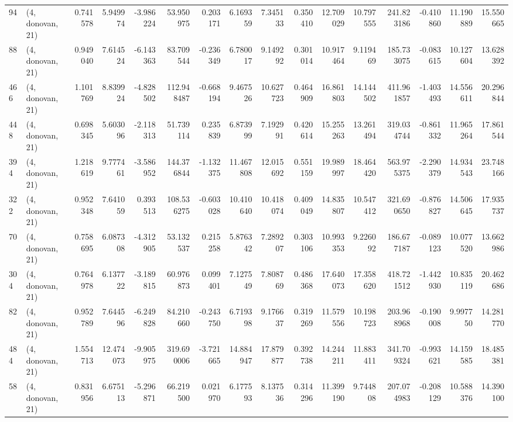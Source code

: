 \begin{tabular}{llrrrrrrrrrrrrrr}
94  &  (4, donovan, 21) &   0.741578 &   5.949974 &  -3.986224 &    53.950975 &   0.203171 &   6.169359 &   7.345133 &  0.350410 &  12.709029 &  10.797555 &    241.823186 &   -0.410860 &   11.190889 &   15.550665 \\
88  &  (4, donovan, 21) &   0.949040 &   7.614524 &  -6.143363 &    83.709544 &  -0.236349 &   6.780017 &   9.149292 &  0.301014 &  10.917464 &   9.119469 &    185.733075 &   -0.083615 &   10.127604 &   13.628392 \\
466 &  (4, donovan, 21) &   1.101769 &   8.839924 &  -4.828502 &   112.948487 &  -0.668194 &   9.467526 &  10.627723 &  0.464909 &  16.861803 &  14.144502 &    411.961857 &   -1.403493 &   14.556611 &   20.296844 \\
448 &  (4, donovan, 21) &   0.698345 &   5.603096 &  -2.118313 &    51.739114 &   0.235839 &   6.873999 &   7.192991 &  0.420614 &  15.255263 &  13.261494 &    319.034744 &   -0.861332 &   11.965264 &   17.861544 \\
394 &  (4, donovan, 21) &   1.218619 &   9.777461 &  -3.586952 &   144.376844 &  -1.132375 &  11.467808 &  12.015692 &  0.551159 &  19.989997 &  18.464420 &    563.975375 &   -2.290379 &   14.934543 &   23.748166 \\
322 &  (4, donovan, 21) &   0.952348 &   7.641059 &   0.393513 &   108.536275 &  -0.603028 &  10.410640 &  10.418074 &  0.409049 &  14.835807 &  10.547412 &    321.690650 &   -0.876827 &   14.506645 &   17.935737 \\
70  &  (4, donovan, 21) &   0.758695 &   6.087308 &  -4.312905 &    53.132537 &   0.215258 &   5.876342 &   7.289207 &  0.303106 &  10.993353 &   9.226092 &    186.677187 &   -0.089123 &   10.077520 &   13.662986 \\
304 &  (4, donovan, 21) &   0.764978 &   6.137722 &  -3.189815 &    60.976873 &   0.099401 &   7.127549 &   7.808769 &  0.486368 &  17.640073 &  17.358620 &    418.721512 &   -1.442930 &   10.835119 &   20.462686 \\
82  &  (4, donovan, 21) &   0.952789 &   7.644596 &  -6.249828 &    84.210660 &  -0.243750 &   6.719398 &   9.176637 &  0.319269 &  11.579556 &  10.198723 &    203.968968 &   -0.190008 &    9.997750 &   14.281770 \\
484 &  (4, donovan, 21) &   1.554713 &  12.474073 &  -9.905975 &   319.690006 &  -3.721665 &  14.884947 &  17.879877 &  0.392738 &  14.244211 &  11.883411 &    341.709324 &   -0.993621 &   14.159585 &   18.485381 \\
58  &  (4, donovan, 21) &   0.831956 &   6.675113 &  -5.296871 &    66.219500 &   0.021970 &   6.177593 &   8.137536 &  0.314296 &  11.399190 &   9.744808 &    207.074983 &   -0.208129 &   10.588376 &   14.390100 \\

\end{tabular}
